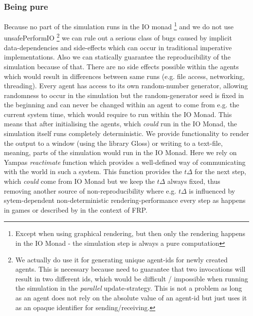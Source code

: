 \subsubsection{Being pure}
Because no part of the simulation runs in the IO monad \footnote{Except when using graphical rendering, but then only the rendering happens in the IO Monad - the simulation step is always a pure computation} and we do not use unsafePerformIO \footnote{We actually do use it for generating unique agent-ids for newly created agents. This is necessary because need to guarantee that two invocations will result in two different ids, which would be difficult / impossible when running the simulation in the \textit{parallel} update-strategy. This is not a problem as long as an agent does not rely on the absolute value of an agent-id but just uses it as an opaque identifier for sending/receiving.} we can rule out a serious class of bugs caused by implicit data-dependencies and side-effects which can occur in traditional imperative implementations.
Also we can statically guarantee the reproducibility of the simulation because of that. There are no side effects possible within the agents which would result in differences between same runs (e.g. file access, networking, threading). Every agent has access to its own random-number generator, allowing randomness to occur in the simulation but the random-generator seed is fixed in the beginning and can never be changed within an agent to come from e.g. the current system time, which would require to run within the IO Monad. This means that after initialising the agents, which \textit{could} run in the IO Monad, the simulation itself runs completely deterministic.
We provide functionality to render the output to a window (using the library Gloss) or writing to a text-file, meaning, parts of the simulation would run in the IO Monad. Here we rely on Yampas \textit{reactimate} function which provides a well-defined way of communicating with the world in such a system. This function provides the $t\Delta$ for the next step, which \textit{could} come from IO Monad but we keep the $t\Delta$ always fixed, thus removing another source of non-reproducibility where e.g. $t\Delta$ is influenced by sytem-dependent non-deterministic rendering-performance every step as happens in games or described by \cite{perez_testing_2017} in the context of FRP.

